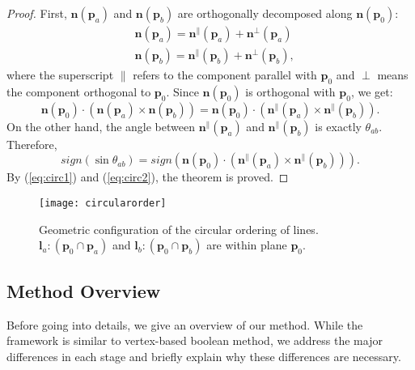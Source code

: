 \begin{proof}
 First, $\bm{n}(\bm{p}_a)$ and $\bm{n}(\bm{p}_b)$ are orthogonally decomposed along $\bm{n}(\bm{p}_0)$:
 \begin{equation}
 \begin{split}
   &\bm{n}(\bm{p}_a)= \bm{n}^\parallel(\bm{p}_a) + \bm{n}^\perp(\bm{p}_a)\\
   &\bm{n}(\bm{p}_b)= \bm{n}^\parallel(\bm{p}_b) + \bm{n}^\perp(\bm{p}_b),
 \end{split}
 \end{equation}
 where the superscript $\parallel$ refers to the component parallel with $\bm{p}_0$ and $\perp$ means the component orthogonal to $\bm{p}_0$. Since $\bm{n}(\bm{p}_0)$ is orthogonal with $\bm{p}_0$, we get:
 \begin{equation}
   \label{eq:circ1}
   \bm{n}(\bm{p}_0) \cdot (\bm{n}(\bm{p}_a) \times \bm{n}(\bm{p}_b)) = \bm{n}(\bm{p}_0) \cdot (\bm{n}^\parallel(\bm{p}_a) \times \bm{n}^\parallel(\bm{p}_b)).
 \end{equation}
 On the other hand, the angle between $\bm{n}^\parallel(\bm{p}_a)$ and $\bm{n}^\parallel(\bm{p}_b)$ is exactly $\theta_{ab}$. Therefore,
 \begin{equation}
   \label{eq:circ2}
   sign(\sin{\theta_{ab}})=  sign(\bm{n}(\bm{p}_0) \cdot (\bm{n}^\parallel(\bm{p}_a) \times \bm{n}^\parallel(\bm{p}_b))).
 \end{equation}
 By (\ref{eq:circ1}) and (\ref{eq:circ2}), the theorem is proved.
\end{proof}

\begin{figure}[t]
\centering
\texttt{[image: circularorder]}
\caption{Geometric configuration of the circular ordering of lines. $\bm{l}_a\colon(\bm{p}_0 \cap \bm{p}_a)$ and $\bm{l}_b\colon(\bm{p}_0 \cap \bm{p}_b)$ are within plane $\bm{p}_0$.}
\label{fig:circularorder}
\end{figure}

\subsection{Method Overview}

Before going into details, we give an overview of our method. While the framework is similar to vertex-based boolean method, we address the major differences in each stage and briefly explain why these differences are necessary.

